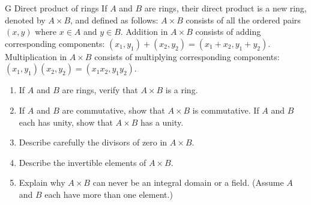 \begin{exercise}{G Direct product of rings}
If $A$ and $B$ are rings, their direct product is a new ring, denoted by $A\times B$, and defined as follows: $A\times B$ consists of all the ordered pairs $(x,y)$ where $x\in A$ and $y\in B$. Addition in $A\times B$ consists of adding corresponding components: $(x_{1}, y_{1}) + (x_{2}, y_{2}) = (x_{1}+x_{2}, y_{1}+y_{2})$. Multiplication in $A\times B$ consists of multiplying corresponding components: $(x_{1}, y_{1})(x_{2}, y_{2}) = (x_{1}x_{2}, y_{1}y_{2})$.
    \begin{enumerate}
        \item If $A$ and $B$ are rings, verify that $A\times B$ is a ring. 
        \item If $A$ and $B$ are commutative, show that $A\times B$ is commutative. If $A$ and $B$ each has unity, show that $A\times B$ has a unity. 
        \item Describe carefully the divisors of zero in $A\times B$.
        \item Describe the invertible elements of $A\times B$.
        \item Explain why $A\times B$ can never be an integral domain or a field. (Assume $A$ and $B$ each have more than one element.)
    \end{enumerate}
\end{exercise}
